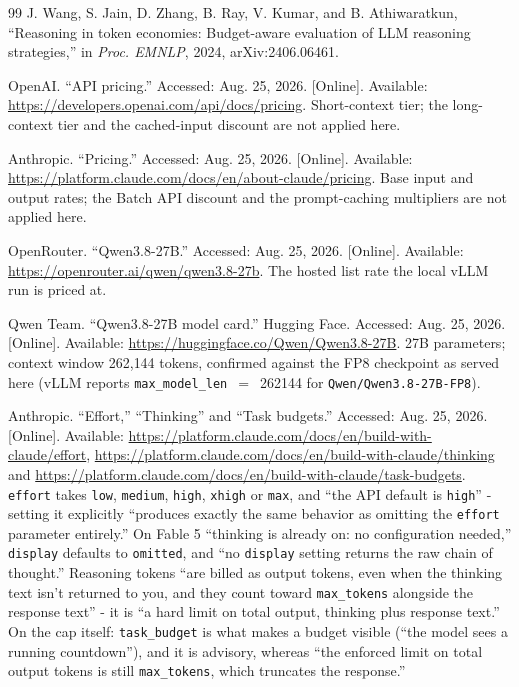 \documentclass[11pt]{article}
\begin{document}
\begin{thebibliography}{99}
 J. Wang, S. Jain, D. Zhang, B. Ray, V. Kumar, and B. Athiwaratkun,
``Reasoning in token economies: Budget-aware evaluation of LLM reasoning strategies,'' in
\textit{Proc. EMNLP}, 2024, arXiv:2406.06461.

 OpenAI. ``API pricing.'' Accessed: Aug. 25, 2026. [Online].
Available: \url{https://developers.openai.com/api/docs/pricing}. Short-context tier; the
long-context tier and the cached-input discount are not applied here.

 Anthropic. ``Pricing.'' Accessed: Aug. 25, 2026. [Online].
Available: \url{https://platform.claude.com/docs/en/about-claude/pricing}. Base input and
output rates; the Batch API discount and the prompt-caching multipliers are not applied
here.

 OpenRouter. ``Qwen3.8-27B.'' Accessed: Aug. 25, 2026. [Online].
Available: \url{https://openrouter.ai/qwen/qwen3.8-27b}. The hosted list rate the local
vLLM run is priced at.

 Qwen Team. ``Qwen3.8-27B model card.'' Hugging Face. Accessed: Aug.
25, 2026. [Online]. Available: \url{https://huggingface.co/Qwen/Qwen3.8-27B}. 27B parameters;
context window 262{,}144 tokens, confirmed against the FP8 checkpoint as served here
(vLLM reports \texttt{max\_model\_len}~$=$~262144 for \texttt{Qwen/Qwen3.8-27B-FP8}).

 Anthropic. ``Effort,'' ``Thinking'' and ``Task budgets.''
Accessed: Aug. 25,
2026. [Online]. Available: \url{https://platform.claude.com/docs/en/build-with-claude/effort},
\url{https://platform.claude.com/docs/en/build-with-claude/thinking} and
\url{https://platform.claude.com/docs/en/build-with-claude/task-budgets}. \texttt{effort}
takes \texttt{low}, \texttt{medium}, \texttt{high}, \texttt{xhigh} or \texttt{max}, and
``the API default is \texttt{high}'' - setting it explicitly ``produces exactly the same
behavior as omitting the \texttt{effort} parameter entirely.'' On Fable 5 ``thinking is
already on: no configuration needed,'' \texttt{display} defaults to \texttt{omitted}, and
``no \texttt{display} setting returns the raw chain of thought.'' Reasoning tokens ``are
billed as output tokens, even when the thinking text isn't returned to you, and they count
toward \texttt{max\_tokens} alongside the response text'' - it is ``a hard limit on total
output, thinking plus response text.'' On the cap itself: \texttt{task\_budget} is what
makes a budget visible (``the model sees a running countdown''), and it is advisory,
whereas ``the enforced limit on total output tokens is still \texttt{max\_tokens}, which
truncates the response.''


\end{thebibliography}
\end{document}
